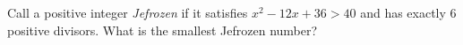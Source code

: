 Call a positive integer \emph{Jefrozen} if it satisfies $x^2-12x+36>40$ and has exactly $6$ positive divisors. What is the smallest Jefrozen number?
